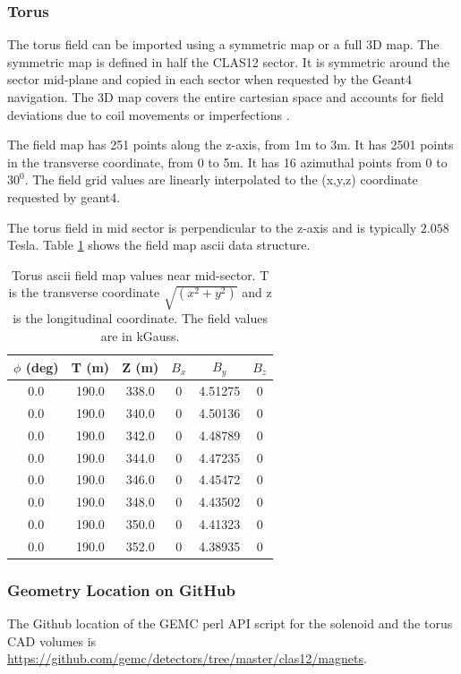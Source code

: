 \subsubsection{Torus}
The torus field can be imported using a symmetric map or a full 3D map.
The symmetric map is defined in half the CLAS12 sector. It is symmetric around the sector mid-plane and copied in each sector
when requested by the Geant4 navigation. The 3D map covers the entire cartesian space and accounts for field deviations due to coil
movements or imperfections \cite{GhoshalSolenoid}.


The field map has 251 points along the z-axis, from 1m to 3m. It has 2501 points in the transverse coordinate, from 0 to 5m.
It has 16 azimuthal points from $0$ to $30^0$. The field grid values are linearly interpolated to the (x,y,z) coordinate requested by geant4.

The torus field in mid sector is perpendicular to the z-axis and is typically $2.058$ Tesla.
Table \ref{tab:torMap} shows the field map ascii data structure.

\begin{table}[h]
	\begin{center}
		\begin{tabular}{| c | c | c | c | c | c | }
         $\phi$ (deg) & T (m)    & Z (m)    &  $B_x $  &    $B_y$    & $B_z$\\
			\hline
          0.0         &  190.0   &  338.0   &  0       &     4.51275 &  0 \\
          0.0         &  190.0   &  340.0   &  0       &     4.50136 &  0 \\
          0.0         &  190.0   &  342.0   &  0       &     4.48789 &  0 \\
          0.0         &  190.0   &  344.0   &  0       &     4.47235 &  0 \\
          0.0         &  190.0   &  346.0   &  0       &     4.45472 &  0 \\
          0.0         &  190.0   &  348.0   &  0       &     4.43502 &  0 \\
          0.0         &  190.0   &  350.0   &  0       &     4.41323 &  0 \\
          0.0         &  190.0   &  352.0   &  0       &     4.38935 &  0 \\
		\end{tabular}
	\end{center}
	\caption{Torus ascii field map values near mid-sector. T is the transverse coordinate $\sqrt{(x^2+y^2)}$ and z is the longitudinal coordinate.
            The field values are in kGauss.}\label{tab:torMap}
\end{table}


\subsubsection{Geometry Location on GitHub}
The Github location of the GEMC perl API script for the solenoid and the torus CAD volumes is \url{https://github.com/gemc/detectors/tree/master/clas12/magnets}.

